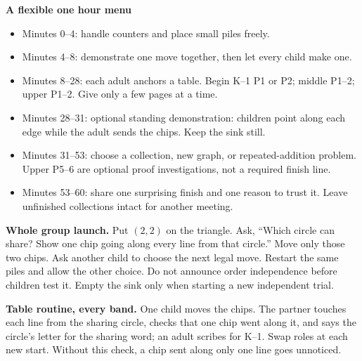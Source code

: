 \documentclass[11pt,letterpaper]{article}
\begin{document}
\textbf{A flexible one hour menu}
\begin{itemize}
\item Minutes 0--4: handle counters and place small piles freely.
\item Minutes 4--8: demonstrate one move together, then let every child make one.
\item Minutes 8--28: each adult anchors a table. Begin K--1 P1 or P2; middle P1--2; upper P1--2. Give only a few pages at a time.
\item Minutes 28--31: optional standing demonstration: children point along each edge while the adult sends the chips. Keep the sink still.
\item Minutes 31--53: choose a collection, new graph, or repeated-addition problem. Upper P5--6 are optional proof investigations, not a required finish line.
\item Minutes 53--60: share one surprising finish and one reason to trust it. Leave unfinished collections intact for another meeting.
\end{itemize}
\textbf{Whole group launch.} Put $(2,2)$ on the triangle. Ask, ``Which circle can share? Show one chip going along every line from that circle.'' Move only those two chips. Ask another child to choose the next legal move. Restart the same piles and allow the other choice. Do not announce order independence before children test it. Empty the sink only when starting a new independent trial.

\textbf{Table routine, every band.} One child moves the chips. The partner touches each line from the sharing circle, checks that one chip went along it, and says the circle's letter for the sharing word; an adult scribes for K--1. Swap roles at each new start. Without this check, a chip sent along only one line goes unnoticed.
\end{document}
